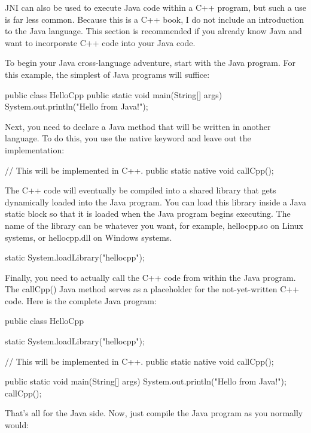 JNI can also be used to execute Java code within a C++ program, but such a use is far less common. Because this is a C++ book, I do not include an introduction to the Java language. This section is recommended if you already know Java and want to incorporate C++ code into your Java code.

To begin your Java cross-language adventure, start with the Java program. For this example, the simplest of Java programs will suffice:

\begin{cpp}
public class HelloCpp
{
    public static void main(String[] args)
    {
        System.out.println("Hello from Java!");
    }
}
\end{cpp}

Next, you need to declare a Java method that will be written in another language. To do this, you use the native keyword and leave out the implementation:

\begin{cpp}
// This will be implemented in C++.
public static native void callCpp();
\end{cpp}

The C++ code will eventually be compiled into a shared library that gets dynamically loaded into the Java program. You can load this library inside a Java static block so that it is loaded when the Java program begins executing. The name of the library can be whatever you want, for example, hellocpp.so on Linux systems, or hellocpp.dll on Windows systems.

\begin{cpp}
static { System.loadLibrary("hellocpp"); }
\end{cpp}

Finally, you need to actually call the C++ code from within the Java program. The callCpp() Java method serves as a placeholder for the not-yet-written C++ code. Here is the complete Java program:

\begin{cpp}
public class HelloCpp
{
    static { System.loadLibrary("hellocpp"); }

    // This will be implemented in C++.
    public static native void callCpp();

    public static void main(String[] args)
    {
        System.out.println("Hello from Java!");
        callCpp();
    }
}
\end{cpp}

That’s all for the Java side. Now, just compile the Java program as you normally would:

